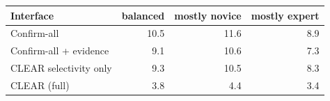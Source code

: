 \begin{tabular}{l rrr}
\toprule
Interface & balanced & mostly novice & mostly expert \\
\midrule
Confirm-all & 10.5 & 11.6 & 8.9 \\
Confirm-all + evidence & 9.1 & 10.6 & 7.3 \\
CLEAR selectivity only & 9.3 & 10.5 & 8.3 \\
CLEAR (full) & 3.8 & 4.4 & 3.4 \\
\bottomrule
\end{tabular}
